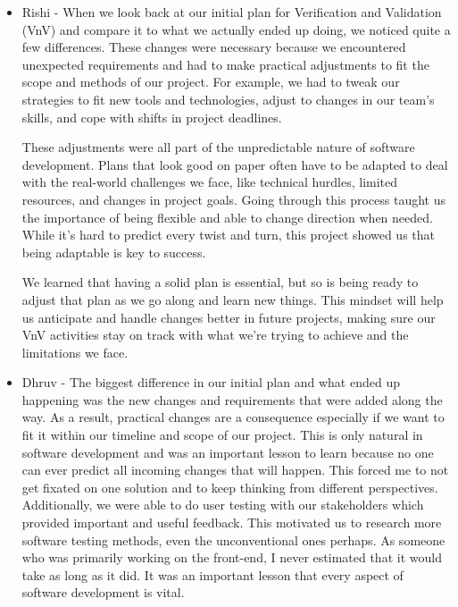 \documentclass[12pt, titlepage]{article}
\begin{document}
\begin{itemize}
    \item Rishi - When we look back at our initial plan for Verification and Validation (VnV) and compare it to what we actually ended up doing, we noticed quite a few differences. These changes were necessary because we encountered unexpected requirements and had to make practical adjustments to fit the scope and methods of our project. For example, we had to tweak our strategies to fit new tools and technologies, adjust to changes in our team's skills, and cope with shifts in project deadlines.
   

These adjustments were all part of the unpredictable nature of software development. Plans that look good on paper often have to be adapted to deal with the real-world challenges we face, like technical hurdles, limited resources, and changes in project goals. Going through this process taught us the importance of being flexible and able to change direction when needed. While it's hard to predict every twist and turn, this project showed us that being adaptable is key to success.

We learned that having a solid plan is essential, but so is being ready to adjust that plan as we go along and learn new things. This mindset will help us anticipate and handle changes better in future projects, making sure our VnV activities stay on track with what we're trying to achieve and the limitations we face.
 \item Dhruv - The biggest difference in our initial plan and what ended up happening was the new changes and requirements that were added along the way. As a result, practical changes are a consequence especially if we want to fit it within our timeline and scope of our project. This is only natural in software development and was an important lesson to learn because no one can ever predict all incoming changes that will happen. This forced me to not get fixated on one solution and to keep thinking from different perspectives. Additionally, we were able to do user testing with our stakeholders which provided important and useful feedback. This motivated us to research more software testing methods, even the unconventional ones perhaps. As someone who was primarily working on the front-end, I never estimated that it would take as long as it did. It was an important lesson that every aspect of software development is vital. 
\end{itemize}
\end{document}
